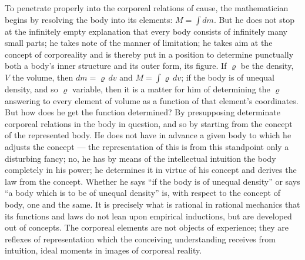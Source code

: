 \documentclass[12pt,a4paper]{book}
\begin{document}
To penetrate properly into the corporeal relations of cause, the mathematician begins by
resolving the body into its elements: $M = \int dm$. But he does not stop at the infinitely
empty explanation that every body consists of infinitely many small parts; he takes note of
the manner of limitation; he takes aim at the concept of corporeality and is thereby put in a
position to determine punctually both a body's inner structure and its outer form, its figure.
If $\varrho$ be the density, $V$ the volume, then $dm = \varrho\,dv$ and $M = \int
\varrho\,dv$; if the body is of unequal density, and so $\varrho$ variable, then it is a
matter for him of determining the $\varrho$ answering to every element of volume as a function
of that element's coordinates. But how does he get the function determined? By presupposing
determinate corporeal relations in the body in question, and so by starting from the concept
of the represented body. He does not have in advance a given
body to which he adjusts the concept --- the representation of this is from this standpoint
only a disturbing fancy; no, he has by means of the intellectual intuition the body completely
in his power; he determines it in virtue of his concept and derives the law from the concept.
Whether he says ``if the body is of unequal density'' or says ``a body which is to be of
unequal density'' is, with respect to the concept of body, one and the same. It is precisely
what is rational in rational mechanics that its functions and laws do not lean upon empirical
inductions, but are developed out of concepts. The corporeal elements are not objects of
experience; they are reflexes of representation which the conceiving understanding receives
from intuition, ideal moments in images of corporeal reality.
\end{document}
